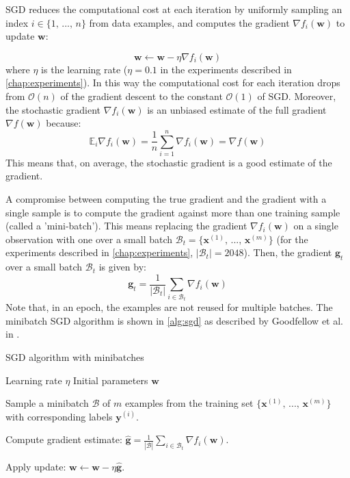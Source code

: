 SGD reduces the computational cost at each iteration by uniformly sampling an index $i \in \{ 1, \, ..., \, n\}$ from data examples, and computes the gradient $\nabla f_i (\textbf{w})$ to update $\textbf{w}$:

\begin{equation}
    \textbf{w} \leftarrow \textbf{w} - \eta \nabla f_i(\textbf{w})
\end{equation}
where $\eta$ is the learning rate ($\eta = 0.1$ in the experiments described in \autoref{chap:experiments}). In this way the computational cost for each iteration drops from $\mathcal{O}(n)$ of the gradient descent to the constant $\mathcal{O}(1)$ of SGD. Moreover, the stochastic gradient $\nabla f_i(\textbf{w})$ is an unbiased estimate of the full gradient $\nabla f(\textbf{w})$ because:
\begin{equation}
    \mathbb{E}_i \nabla f_i(\mathbf{w}) = \frac{1}{n} \sum_{i = 1}^n \nabla f_i(\mathbf{w}) = \nabla f(\mathbf{w})
\end{equation}
This means that, on average, the stochastic gradient is a good estimate of the gradient.

A compromise between computing the true gradient and the gradient with a single sample is to compute the gradient against more than one training sample (called a 'mini-batch'). This means replacing the gradient $\nabla f_i(\textbf{w})$ on a single observation with one over a small batch $\mathcal{B}_t = \{ \textbf{x}^{(1)},\, ..., \, \textbf{x}^{(m)}\}$ (for the experiments described in \autoref{chap:experiments}, $|\mathcal{B}_t| = 2048$). Then, the gradient $\textbf{g}_t$ over a small batch $\mathcal{B}_t$ is given by:
\begin{equation}
    \mathbf{g}_t = \frac{1}{|\mathcal{B}_t|} \sum_{i \in \mathcal{B}_t} \nabla f_i(\mathbf{w})
\end{equation}
Note that, in an epoch, the examples are not reused for multiple batches. The minibatch SGD algorithm is shown in \autoref{alg:sgd} as described by Goodfellow et al. in \cite{Goodfellow-et-al-2016}.


\begin{algorithm}
    \caption{SGD algorithm with minibatches}\label{alg:sgd}
    \begin{algorithmic}
        \Require Learning rate $\eta$
        \Require Initial parameters $\textbf{w}$
        
        
        Sample a minibatch $\mathcal{B}$ of $m$ examples from the training set $\{ \textbf{x}^{(1)},\, ..., \, \textbf{x}^{(m)}\}$ with corresponding labels $\textbf{y}^{(i)}$.

    Compute gradient estimate: $\hat{\mathbf{g}} = \frac{1}{|\mathcal{B}|} \sum_{i \in \mathcal{B}_t} \nabla f_i(\mathbf{w})$.

    Apply update: $\textbf{w} \leftarrow \textbf{w} - \eta \hat{\mathbf{g}}$.

    \EndWhile
    \end{algorithmic}
    \end{algorithm}


